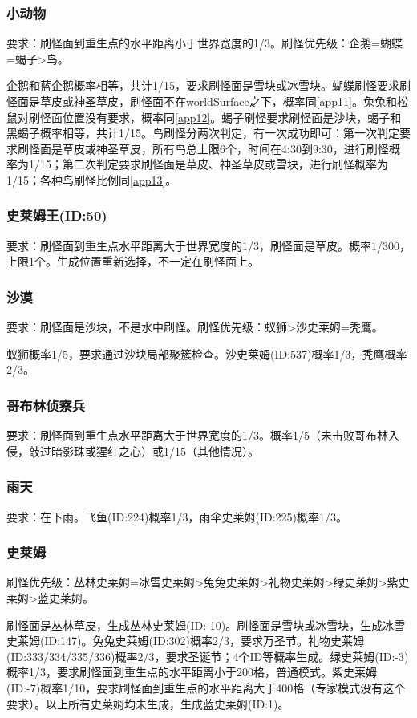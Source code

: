 \subsubsection{小动物}
要求：刷怪面到重生点的水平距离小于世界宽度的1/3。刷怪优先级：企鹅=蝴蝶=蝎子>鸟。

企鹅和蓝企鹅概率相等，共计1/15，要求刷怪面是雪块或冰雪块。蝴蝶刷怪要求刷怪面是草皮或神圣草皮，刷怪面不在worldSurface之下，概率同\autoref{app11}。兔兔和松鼠对刷怪面位置没有要求，概率同\autoref{app12}。蝎子刷怪要求刷怪面是沙块，蝎子和黑蝎子概率相等，共计1/15。鸟刷怪分两次判定，有一次成功即可：第一次判定要求刷怪面是草皮或神圣草皮，所有鸟总上限6个，时间在4:30到9:30，进行刷怪概率为1/15；第二次判定要求刷怪面是草皮、神圣草皮或雪块，进行刷怪概率为1/15；各种鸟刷怪比例同\autoref{app13}。

\subsubsection{史莱姆王(ID:50)}
要求：刷怪面到重生点水平距离大于世界宽度的1/3，刷怪面是草皮。概率1/300，上限1个。生成位置重新选择，不一定在刷怪面上。

\subsubsection{沙漠}
要求：刷怪面是沙块，不是水中刷怪。刷怪优先级：蚁狮>沙史莱姆=秃鹰。

蚁狮概率1/5，要求通过沙块局部聚簇检查。沙史莱姆(ID:537)概率1/3，秃鹰概率2/3。

\subsubsection{哥布林侦察兵}
要求：刷怪面到重生点水平距离大于世界宽度的1/3。概率1/5（未击败哥布林入侵，敲过暗影珠或猩红之心）或1/15（其他情况）。

\subsubsection{雨天}
要求：在下雨。飞鱼(ID:224)概率1/3，雨伞史莱姆(ID:225)概率1/3。

\subsubsection{史莱姆}
刷怪优先级：丛林史莱姆=冰雪史莱姆>兔兔史莱姆>礼物史莱姆>绿史莱姆>紫史莱姆>蓝史莱姆。

刷怪面是丛林草皮，生成丛林史莱姆(ID:-10)。刷怪面是雪块或冰雪块，生成冰雪史莱姆(ID:147)。兔兔史莱姆(ID:302)概率2/3，要求万圣节。礼物史莱姆(ID:333/334/335/336)概率2/3，要求圣诞节；4个ID等概率生成。绿史莱姆(ID:-3)概率1/3，要求刷怪面到重生点的水平距离小于200格，普通模式。紫史莱姆(ID:-7)概率1/10，要求刷怪面到重生点的水平距离大于400格（专家模式没有这个要求）。以上所有史莱姆均未生成，生成蓝史莱姆(ID:1)。

